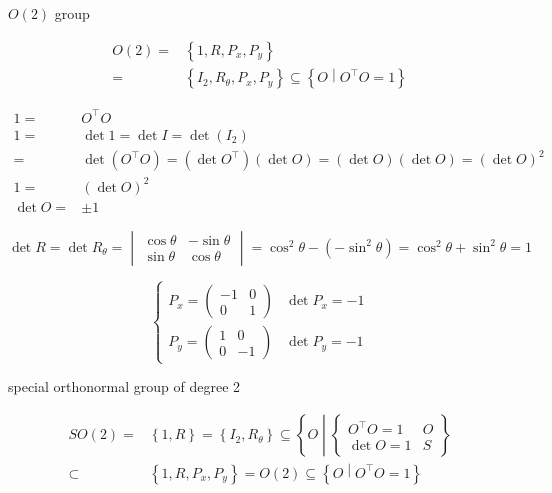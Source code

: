 \documentclass[
]{book}
\theoremstyle{definition}
\theoremstyle{definition}
\theoremstyle{definition}
\theoremstyle{definition}
\theoremstyle{remark}
\begin{document}
\(O\left(2\right)\) group

\[
\begin{aligned}
O\left(2\right)=&\left\{ 1,R,P_{{\scriptscriptstyle x}},P_{{\scriptscriptstyle y}}\right\} \\=&\left\{ I_{{\scriptscriptstyle 2}},R_{{\scriptscriptstyle \theta}},P_{{\scriptscriptstyle x}},P_{{\scriptscriptstyle y}}\right\} \subseteq\left\{ O\middle|O^{\intercal}O=1\right\}
\end{aligned}
\]

\[
\begin{aligned}
1= & O^{\intercal}O\\
1= & \det1=\det I=\det\left(I_{{\scriptscriptstyle 2}}\right)\\
= & \det\left(O^{\intercal}O\right)=\left(\det O^{\intercal}\right)\left(\det O\right)=\left(\det O\right)\left(\det O\right)=\left(\det O\right)^{2}\\
1= & \left(\det O\right)^{2}\\
\det O= & \pm1
\end{aligned}
\]

\[
\det R=\det R_{{\scriptscriptstyle \theta}}=\begin{vmatrix}\cos\theta & -\sin\theta\\
\sin\theta & \cos\theta
\end{vmatrix}=\cos^{2}\theta-\left(-\sin^{2}\theta\right)=\cos^{2}\theta+\sin^{2}\theta=1
\]

\[
\begin{cases}
P_{{\scriptscriptstyle x}}=\begin{pmatrix}-1 & 0\\
0 & 1
\end{pmatrix} & \det P_{{\scriptscriptstyle x}}=-1\\
P_{{\scriptscriptstyle y}}=\begin{pmatrix}1 & 0\\
0 & -1
\end{pmatrix} & \det P_{{\scriptscriptstyle y}}=-1
\end{cases}
\]

special orthonormal group of degree 2

\[
\begin{aligned}
SO\left(2\right)= & \left\{ 1,R\right\} =\left\{ I_{{\scriptscriptstyle 2}},R_{{\scriptscriptstyle \theta}}\right\} \subseteq\left\{ O\middle|\begin{cases}
O^{\intercal}O=1 & O\\
\det O=1 & S
\end{cases}\right\} \\
\subset & \left\{ 1,R,P_{{\scriptscriptstyle x}},P_{{\scriptscriptstyle y}}\right\} =O\left(2\right)\subseteq\left\{ O\middle|O^{\intercal}O=1\right\} 
\end{aligned}
\]
\end{document}
